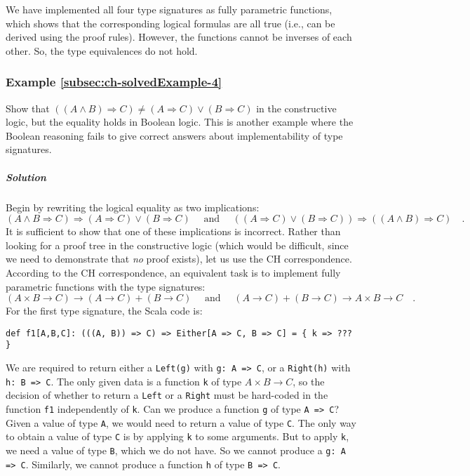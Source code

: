 We have implemented all four type signatures as fully parametric functions,
which shows that the corresponding logical formulas are all true (i.e.,
can be derived using the proof rules). However, the functions cannot
be inverses of each other. So, the type equivalences do not hold.

\subsubsection{Example \label{subsec:ch-solvedExample-4}\ref{subsec:ch-solvedExample-4}}

Show that $\left(\left(A\wedge B\right)\Rightarrow C\right)\neq(A\Rightarrow C)\vee(B\Rightarrow C)$
in the constructive logic, but the equality holds in Boolean logic.
This is another example where the Boolean reasoning fails to give
correct answers about implementability of type signatures.

\subparagraph{Solution}

Begin by rewriting the logical equality as two implications:
\[
(A\wedge B\Rightarrow C)\Rightarrow(A\Rightarrow C)\vee(B\Rightarrow C)\quad\text{ and }\quad\left((A\Rightarrow C)\vee(B\Rightarrow C)\right)\Rightarrow\left(\left(A\wedge B\right)\Rightarrow C\right)\quad.
\]
It is sufficient to show that one of these implications is incorrect.
Rather than looking for a proof tree in the constructive logic (which
would be difficult, since we need to demonstrate that \emph{no} proof
exists), let us use the CH correspondence. According to the CH correspondence,
an equivalent task is to implement fully parametric functions with
the type signatures:
\[
(A\times B\rightarrow C)\rightarrow(A\rightarrow C)+(B\rightarrow C)\quad\text{ and }\quad(A\rightarrow C)+(B\rightarrow C)\rightarrow A\times B\rightarrow C\quad.
\]
For the first type signature, the Scala code is:
\begin{lstlisting}
def f1[A,B,C]: (((A, B)) => C) => Either[A => C, B => C] = { k => ??? }
\end{lstlisting}
We are required to return either a \lstinline!Left(g)! with \lstinline!g: A => C!,
or a \lstinline!Right(h)! with \lstinline!h: B => C!. The only given
data is a function \lstinline!k! of type $A\times B\rightarrow C$,
so the decision of whether to return a \lstinline!Left! or a \lstinline!Right!
must be hard-coded in the function \lstinline!f1! independently of
\lstinline!k!. Can we produce a function \lstinline!g! of type \lstinline!A => C!?
Given a value of type \lstinline!A!, we would need to return a value
of type \lstinline!C!. The only way to obtain a value of type \lstinline!C!
is by applying \lstinline!k! to some arguments. But to apply \lstinline!k!,
we need a value of type \lstinline!B!, which we do not have. So we
cannot produce a \lstinline!g: A => C!. Similarly, we cannot produce
a function \lstinline!h! of type \lstinline!B => C!.

